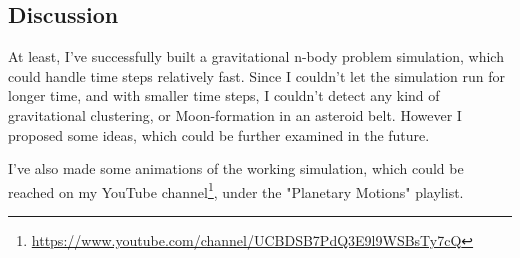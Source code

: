 \begin{multicols}{2}
\section{Discussion}
At least, I've successfully built a gravitational n-body problem simulation, which could handle time steps relatively fast. Since I couldn't let the simulation run for longer time, and with smaller time steps, I couldn't detect any kind of gravitational clustering, or Moon-formation in an asteroid belt. However I proposed some ideas, which could be further examined in the future. \par
I've also made some animations of the working simulation, which could be reached on my YouTube channel\footnote{\url{https://www.youtube.com/channel/UCBDSB7PdQ3E9l9WSBsTy7cQ}}, under the "Planetary Motions" playlist.

\end{multicols}